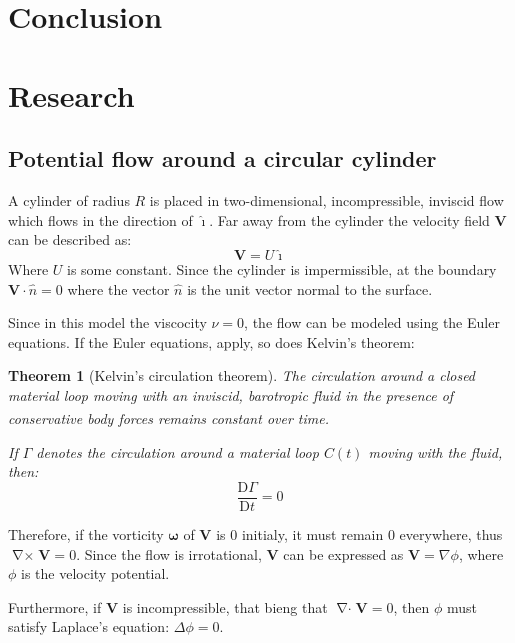 \documentclass[a4paper,12pt]{article}
\newcommand{\ihat}{\hat{\imath}}
\newcommand{\nhat}{\hat{n}}
\newcommand{\materialder}[2]{\frac{\mathrm{D} #1}{\mathrm{D} #2}}   %
\DeclareMathOperator{\divergence}{\nabla\cdot}
\DeclareMathOperator{\curl}{\nabla\times}
\newcommand{\needcitation}{\textsuperscript{\normalfont[Citation Needed]}}
\newtheorem{theorem}{Theorem}[section]
\begin{document}
\section{Conclusion}

\newpage


\renewcommand{\listfigurename}{\thesection\hspace{20pt}List of Figures}\listoffigures

\newpage
\section{Research}
\subsection{Potential flow around a circular cylinder}
A cylinder of radius $R$ is placed in two-dimensional, incompressible, inviscid flow which flows in the direction of $\ihat$.
Far away from the cylinder the velocity field $\mathbf{V}$ can be described as: 
\begin{equation}\label{equation:in-infinitum}
	\mathbf{V}=U\ihat
\end{equation}
Where $U$ is some constant. Since the cylinder is impermissible, at the boundary $\mathbf{V}\cdot\nhat=0$ where the vector $\nhat$ is the unit vector normal to the surface. 

Since in this model the viscocity $\nu=0$, the flow can be modeled using the Euler equations. If the Euler equations, apply, so does Kelvin's theorem:
\begin{theorem}[Kelvin's circulation theorem]
	The circulation around a closed material loop moving with an inviscid, barotropic fluid in the presence of conservative body forces remains constant over time.\needcitation
	
	If $\Gamma$ denotes the circulation around a material loop $C(t)$ moving with the fluid, then:
	$$\materialder{\Gamma}{t}=0$$
\end{theorem}

Therefore, if the vorticity $\boldsymbol{\omega}$ of $\mathbf{V}$ is $0$ initialy, it must remain $0$ everywhere, thus $\curl\mathbf{V}=0$. Since the flow is irrotational, $\mathbf{V}$ can be expressed as $\mathbf{V}=\nabla\phi$, where $\phi$ is the velocity potential.

Furthermore, if $\mathbf{V}$ is incompressible, that bieng that $\divergence\mathbf{V}=0$, then $\phi$ must satisfy Laplace's equation: $\Delta\phi=0$.
\end{document}
